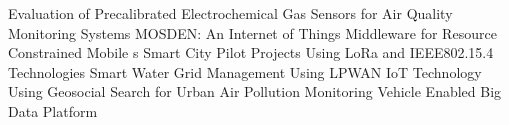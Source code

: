  \cite{malky_evaluation_2019} Evaluation of {{Precalibrated Electrochemical Gas Sensors}} for {{Air Quality Monitoring Systems}} \newline 
 \cite{perera_mosden_2013} {{MOSDEN}}: {{An Internet}} of {{Things Middleware}} for {{Resource Constrained Mobile s}} \newline 
 \cite{pasolini_smart_2018} Smart {{City Pilot Projects Using LoRa}} and {{IEEE802}}.15.4 {{Technologies}} \newline 
 \cite{saravanan_smart_2017} Smart Water Grid Management Using {{LPWAN IoT}} Technology \newline 
 \cite{sammarco_using_2017} Using Geosocial Search for Urban Air Pollution Monitoring \newline 
 \cite{ho_vehicle_2016} Vehicle {{Enabled Big Data Platform}} \newline 

\restoregeometry
